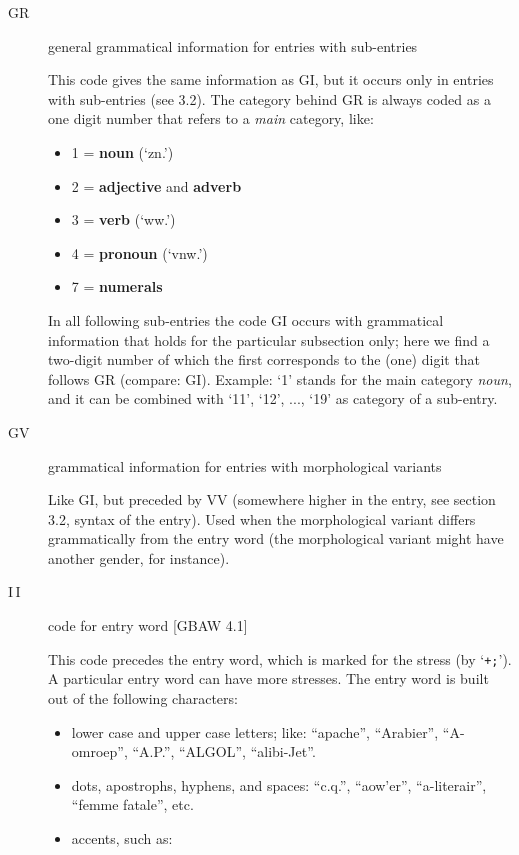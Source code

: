 \begin{description}
   \item [GR] general grammatical information for entries with sub-entries

        This code gives the same information as GI, but it occurs only in
        entries with sub-entries (see 3.2).
        The category behind GR is always coded as a one digit number that refers
        to a {\em main} category, like:
        \begin{itemize}

          \item 1  = {\bf noun} (`zn.')

          \item 2  = {\bf adjective} and {\bf adverb}

          \item 3  = {\bf verb} (`ww.')

          \item 4  = {\bf pronoun} (`vnw.')

          \item 7  = {\bf numerals}
        \end{itemize}
        In all following sub-entries the code GI occurs with grammatical
        information that holds for the particular subsection only; here
        we find a two-digit number of which the first corresponds to the
        (one) digit that follows GR (compare: GI).
        Example: `1' stands for the main category {\em noun}, and it can be
        combined with `11', `12', ..., `19' as category of a sub-entry.
        

   \item [GV] grammatical information for entries with morphological variants 

        Like GI, but preceded by VV (somewhere higher in the entry, see section
        3.2, syntax of the entry). Used when the morphological variant differs
        grammatically from the entry word (the morphological variant might have
        another gender, for instance).

   \item [I\,I] code for entry word [GBAW 4.1]

        This code precedes the entry word, which is marked for the stress (by
        `{\tt +;}'). A particular entry word can have more stresses. The entry word 
        is built out of the following characters:
     \begin{itemize}
        \item lower case and upper case letters; like: ``apache'', 
              ``Arabier'', ``A-omroep'', ``A.P.'', ``ALGOL'', ``alibi-Jet''.
         \item dots, apostrophs, hyphens, and spaces: ``c.q.'', ``aow'er'', 
              ``a-literair'', ``femme fatale'', etc.
        \item accents, such as:


\end{itemize}
\end{description}
